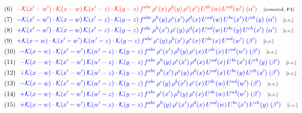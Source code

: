 \documentclass[9pt]{article}
\begin{document}
\begin{align}
&\quad\text{(6)}\ \ \textcolor{red}{- \mathcal{K}(x'-w')\cdot \mathcal{K}(x-w)\,\mathcal{K}(x'-z) \cdot \mathcal{K}(y-z)\, f^{abc}\,\rho^{e}(x)\,\rho^{b}(y)\,\rho^{c}(x')\,U^{de}(w)\,U^{ad}(w')\;(\alpha')}\quad\text{\scriptsize[removed, F4]}\notag\\
&\quad\text{(7)}\ \ \textcolor{blue}{-\mathcal{K}(x'-w')\cdot\mathcal{K}(x-w)\,\mathcal{K}(x'-z)\cdot\mathcal{K}(y-z)\, f^{abc}\,\rho^{h}(y)\,\rho^{e}(x')\,\rho^{d}(x)\,U^{ad}(w)\,U^{be}(x')\,U^{ch}(y)\;(\alpha')}\quad\text{\scriptsize[c.c.]}\notag\\
&\quad\text{(8)}\ \ \textcolor{blue}{+\mathcal{K}(x'-w')\cdot\mathcal{K}(x-w)\,\mathcal{K}(x'-z)\cdot\mathcal{K}(y-z)\, f^{abc}\,\rho^{h}(x')\,\rho^{e}(y)\,\rho^{d}(x)\,U^{ad}(w)\,U^{be}(y)\,U^{ch}(x')\;(\alpha')}\quad\text{\scriptsize[c.c.]}\notag\\
&\quad\text{(9)}\ \ \textcolor{blue}{+\mathcal{K}(x-w)\cdot\mathcal{K}(x'-w')\,\mathcal{K}(w'-z)\cdot\mathcal{K}(y-z)\, f^{abc}\,\rho^{c}(y)\,\rho^{b}(x')\,\rho^{e}(x)\,U^{de}(x)\,U^{ad}(w')\;(\beta')}\quad\text{\scriptsize[c.c.]}\notag\\
&\quad\text{(10)}\ \ \textcolor{blue}{-\mathcal{K}(x-w)\cdot\mathcal{K}(x'-w')\,\mathcal{K}(w'-z)\cdot\mathcal{K}(y-z)\, f^{abc}\,\rho^{c}(x')\,\rho^{b}(y)\,\rho^{e}(x)\,U^{de}(x)\,U^{ad}(w')\;(\beta')}\quad\text{\scriptsize[c.c.]}\notag\\
&\quad\text{(11)}\ \ \textcolor{blue}{-\mathcal{K}(x-w)\cdot\mathcal{K}(x'-w')\,\mathcal{K}(w'-z)\cdot\mathcal{K}(y-z)\, f^{abc}\,\rho^{h}(y)\,\rho^{e}(x')\,\rho^{d}(x)\,U^{ad}(x)\,U^{be}(x')\,U^{ch}(y)\;(\beta')}\quad\text{\scriptsize[c.c.]}\notag\\
&\quad\text{(12)}\ \ \textcolor{blue}{+\mathcal{K}(x-w)\cdot\mathcal{K}(x'-w')\,\mathcal{K}(w'-z)\cdot\mathcal{K}(y-z)\, f^{abc}\,\rho^{h}(x')\,\rho^{e}(y)\,\rho^{d}(x)\,U^{ad}(x)\,U^{be}(y)\,U^{ch}(x')\;(\beta')}\quad\text{\scriptsize[c.c.]}\notag\\
&\quad\text{(13)}\ \ \textcolor{blue}{-\mathcal{K}(x-w)\cdot\mathcal{K}(x'-w')\,\mathcal{K}(w'-z)\cdot\mathcal{K}(y-z)\, f^{abc}\,\rho^{c}(y)\,\rho^{b}(x')\,\rho^{e}(x)\,U^{de}(w)\,U^{ad}(w')\;(\beta')}\quad\text{\scriptsize[c.c.]}\notag\\
&\quad\text{(14)}\ \ \textcolor{blue}{+\mathcal{K}(x-w)\cdot\mathcal{K}(x'-w')\,\mathcal{K}(w'-z)\cdot\mathcal{K}(y-z)\, f^{abc}\,\rho^{c}(x')\,\rho^{b}(y)\,\rho^{e}(x)\,U^{de}(w)\,U^{ad}(w')\;(\beta')}\quad\text{\scriptsize[c.c.]}\notag\\
&\quad\text{(15)}\ \ \textcolor{blue}{+\mathcal{K}(x-w)\cdot\mathcal{K}(x'-w')\,\mathcal{K}(w'-z)\cdot\mathcal{K}(y-z)\, f^{abc}\,\rho^{h}(y)\,\rho^{e}(x')\,\rho^{d}(x)\,U^{ad}(w)\,U^{be}(x')\,U^{ch}(y)\;(\beta')}\quad\text{\scriptsize[c.c.]}\notag\\

\end{align}
\end{document}
